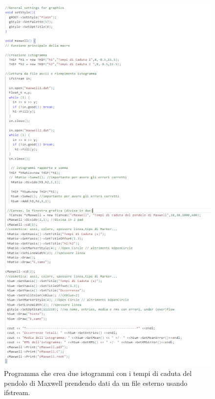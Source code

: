 \documentclass[10pt,a4paper]{article}
\begin{document}
\begin{figure}[h!]
	\centering
	\includegraphics[width=0.8\linewidth]{"Screenshot 2022-06-06 212449"}
	\caption{Programma che crea due istogrammi con i tempi di caduta del pendolo di Maxwell prendendo dati da un file esterno usando ifstream.}
	\label{fig:screenshot-2022-06-06-212449}
\end{figure}

\FloatBarrier
\end{document}
